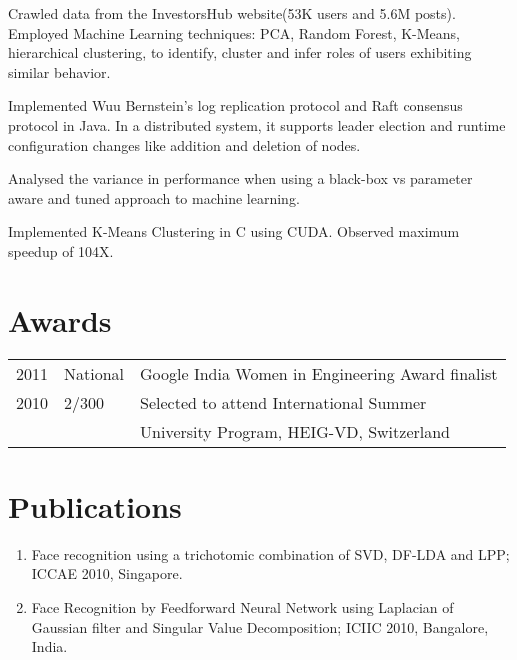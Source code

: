 \documentclass[]{deedy-resume-openfont}
\begin{document}
\begin{minipage}[t]{0.69\textwidth}
 Crawled
data
from
the
InvestorsHub
website(53K users and 5.6M posts).
Employed
Machine
Learning
techniques:
PCA,
Random
Forest,
K-Means,
hierarchical
clustering,
to
identify,
cluster
and
infer
roles
of
users
exhibiting
similar
behavior.

\sectionsep

Implemented Wuu Bernstein’s log replication protocol and Raft consensus protocol in Java. In a distributed system, it supports leader election and runtime configuration changes like addition and deletion of nodes.
\sectionsep

Analysed the variance in performance when using a black-box vs parameter aware and tuned approach to machine learning. \sectionsep

Implemented K-Means Clustering in C using CUDA. Observed maximum speedup of 104X.


\section{Awards} 
\begin{tabular}{rll}
2011	     & National  & Google
India
Women
in
Engineering
Award finalist\\
2010 & 2/300 & Selected to attend International Summer\\  & & University Program, HEIG-VD, Switzerland\\
\end{tabular}


\section{Publications} 
\begin{enumerate}
\item Face
recognition
using
a
trichotomic
combination
of
SVD,
DF-LDA
and
LPP; 
ICCAE
2010, 
Singapore.
\item Face
Recognition
by
Feedforward
Neural
Network
using
Laplacian
of
Gaussian
filter
and
Singular
Value
Decomposition;
ICIIC
2010, 
Bangalore,
India.
\end{enumerate}
\sectionsep

\end{minipage} 
\end{document}
